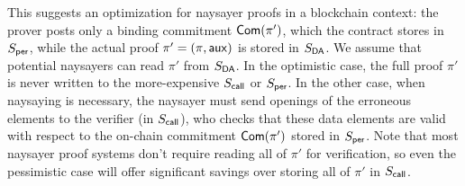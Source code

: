 This suggests an optimization for naysayer proofs in a blockchain context: the prover posts only a binding commitment $\mathsf{Com}(\pi')$, which the contract stores in $S_{\sf per}$, while the actual proof $\pi' = (\pi, \mathsf{aux})$ is stored in $S_{\sf DA}$. We assume that potential naysayers can read $\pi'$ from $S_{\sf DA}$. In the optimistic case, the full proof $\pi'$ is never written to the more-expensive $S_{\sf call}$ or $S_{\sf per}$. In the other case, when naysaying is necessary, the naysayer must send openings of the erroneous elements to the verifier (in $S_{\sf call}$), who checks that these data elements are valid with respect to the on-chain commitment $\mathsf{Com}(\pi')$ stored in $S_{\sf per}$. Note that most naysayer proof systems don't require reading all of $\pi'$ for verification, so even the pessimistic case will offer significant savings over storing all of $\pi'$ in $S_{\sf call}$. 

